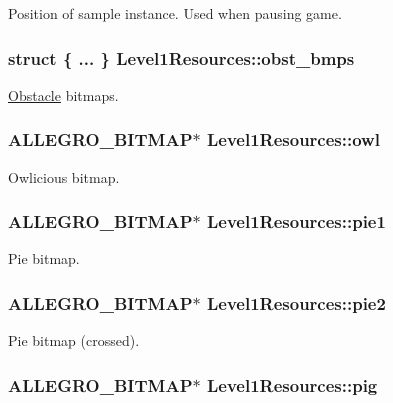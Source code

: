 Position of sample instance. Used when pausing game. \hypertarget{structLevel1Resources_a54107620bd29bf26f241a78914ce201e}{
\subsubsection[{obst\+\_\+bmps}]{\setlength{\rightskip}{0pt plus 5cm}struct \{ ... \}   Level1\+Resources\+::obst\+\_\+bmps}}\label{structLevel1Resources_a54107620bd29bf26f241a78914ce201e}
\hyperlink{structObstacle}{Obstacle} bitmaps. \hypertarget{structLevel1Resources_aa9b6f6612cbc7a39ce78c8becfe5974f}{
\subsubsection[{owl}]{\setlength{\rightskip}{0pt plus 5cm}A\+L\+L\+E\+G\+R\+O\+\_\+\+B\+I\+T\+M\+A\+P$\ast$ Level1\+Resources\+::owl}}\label{structLevel1Resources_aa9b6f6612cbc7a39ce78c8becfe5974f}
Owlicious bitmap. \hypertarget{structLevel1Resources_a0e941dab7ffde828dd149148ddb99f3e}{
\subsubsection[{pie1}]{\setlength{\rightskip}{0pt plus 5cm}A\+L\+L\+E\+G\+R\+O\+\_\+\+B\+I\+T\+M\+A\+P$\ast$ Level1\+Resources\+::pie1}}\label{structLevel1Resources_a0e941dab7ffde828dd149148ddb99f3e}
Pie bitmap. \hypertarget{structLevel1Resources_a3b7afb97f3569c05e2c0014e5a55b109}{
\subsubsection[{pie2}]{\setlength{\rightskip}{0pt plus 5cm}A\+L\+L\+E\+G\+R\+O\+\_\+\+B\+I\+T\+M\+A\+P$\ast$ Level1\+Resources\+::pie2}}\label{structLevel1Resources_a3b7afb97f3569c05e2c0014e5a55b109}
Pie bitmap (crossed). \hypertarget{structLevel1Resources_a9ba75786fd9902f15839bc01b8f3fc00}{
\subsubsection[{pig}]{\setlength{\rightskip}{0pt plus 5cm}A\+L\+L\+E\+G\+R\+O\+\_\+\+B\+I\+T\+M\+A\+P$\ast$ Level1\+Resources\+::pig}}\label{structLevel1Resources_a9ba75786fd9902f15839bc01b8f3fc00}
